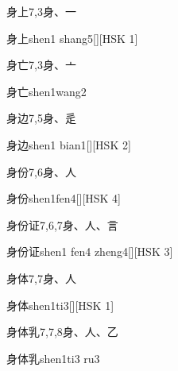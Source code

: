 \begin{Entry}{身上}{7,3}{⾝、⼀}
  \begin{Phonetics}{身上}{shen1 shang5}[][HSK 1]
  \end{Phonetics}
\end{Entry}

\begin{Entry}{身亡}{7,3}{⾝、⼇}
  \begin{Phonetics}{身亡}{shen1wang2}
  \end{Phonetics}
\end{Entry}

\begin{Entry}{身边}{7,5}{⾝、⾡}
  \begin{Phonetics}{身边}{shen1 bian1}[][HSK 2]
  \end{Phonetics}
\end{Entry}

\begin{Entry}{身份}{7,6}{⾝、⼈}
  \begin{Phonetics}{身份}{shen1fen4}[][HSK 4]
  \end{Phonetics}
\end{Entry}

\begin{Entry}{身份证}{7,6,7}{⾝、⼈、⾔}
  \begin{Phonetics}{身份证}{shen1 fen4 zheng4}[][HSK 3]
  \end{Phonetics}
\end{Entry}

\begin{Entry}{身体}{7,7}{⾝、⼈}
  \begin{Phonetics}{身体}{shen1ti3}[][HSK 1]
  \end{Phonetics}
\end{Entry}

\begin{Entry}{身体乳}{7,7,8}{⾝、⼈、⼄}
  \begin{Phonetics}{身体乳}{shen1ti3 ru3}
  \end{Phonetics}
\end{Entry}

